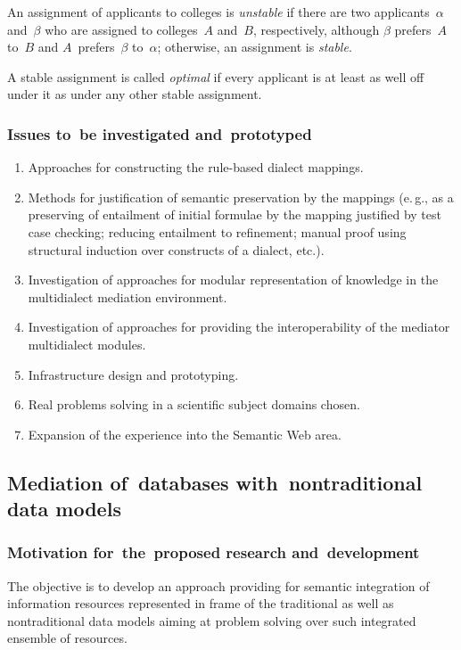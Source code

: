 \begin{multicols}{2}
An assignment of applicants to colleges is \textit{unstable} if there are two applicants~$\alpha$ 
and~$\beta$ who are assigned to colleges~$A$ and~$B$, respectively, although $\beta$ prefers~$A$ 
to~$B$ and $A$~prefers~$\beta$ to~$\alpha$; otherwise, an assignment is \textit{stable}.

A stable assignment is called \textit{optimal} if every applicant is at least as well off under it as 
under any other stable assignment. 

\subsubsection{Issues to~be investigated and~prototyped}

\noindent
\begin{enumerate}[1.]
\item Approaches for constructing the rule-based dialect mappings.
\item Methods for justification of semantic preservation by the mappings (e.\,g., as a preserving 
of entailment of initial formulae by the mapping justified by test case checking; reducing 
entailment to refinement; manual proof using structural induction over constructs of a dialect, 
etc.).
\item Investigation of approaches for modular representation of knowledge in the multidialect 
mediation environment.
\item Investigation of approaches for providing the interoperability of the mediator multidialect 
modules.
\item Infrastructure design and prototyping.
\item Real problems solving in a scientific subject domains chosen.
\item Expansion of the experience into the Semantic Web area.
\end{enumerate}

\subsection{Mediation of~databases with~nontraditional data models}

\subsubsection{Motivation for~the~proposed research and~development}

\noindent
The objective is to develop an approach providing for semantic integration of information 
resources represented in frame of the traditional as well as nontraditional data models aiming at 
problem solving over such integrated ensemble of resources. 


\end{multicols}
